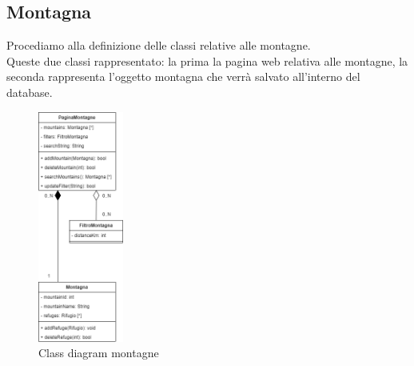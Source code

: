 \documentclass[a4paper,12pt]{article}
\begin{document}
\subsection{Montagna}
Procediamo alla definizione delle classi relative alle montagne. \\
Queste due classi rappresentato: la prima la pagina web relativa alle montagne,  la seconda rappresenta l'oggetto montagna che verrà salvato all'interno del database. 
\begin{figure}[H]
   \centering
   \includegraphics[width=0.25\textwidth] {D3/img/class_diagram_mountains.png}
    \caption{Class diagram montagne}
\end{figure}
\newpage
\end{document}
